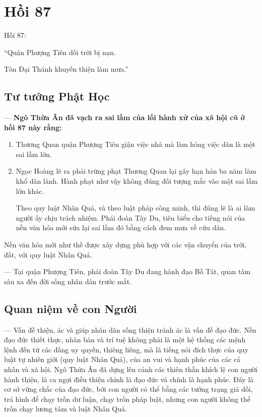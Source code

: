 \chapter{Hồi 87} %
\label{cha:hoi_87}

Hồi 87:

\begin{itshape}
``Quận Phượng Tiên dối trời bị nạn.

Tôn Đại Thánh khuyến thiện làm mưa.''
\end{itshape}

\section{Tư tưởng Phật Học} %
\label{sec:87_phat_hoc}

— {\bf Ngô Thừa Ân đã vạch ra sai lầm của lối hành xử của xã hội cũ ở hồi 87 này rằng:}

\begin{enumerate}[label=\itshape\arabic*\upshape/]
    \item Thương Quan quận Phượng Tiên giận việc nhà mà làm hỏng việc dân là một sai lầm lớn.

    \item Ngọc Hoàng lẽ ra phải trừng phạt Thương Quan lại gây hạn hán ba năm làm khổ dân lành. Hành phạt như vậy không đúng đối tượng mắc vào một sai lầm lớn khác.

    Theo quy luật Nhân Quả, và theo luật pháp công minh, thì đúng lẽ là ai làm người ấy chịu trách nhiệm. Phái đoàn Tây Du, tiêu biểu cho tiếng nói của nền văn hóa mới sửa lại sai lầm đó bằng cách đem mưa về cứu dân.
\end{enumerate}

Nền văn hóa mới như thế được xây dựng phù hợp với các vận chuyển của trời, đất, với quy luật Nhân Quả.

— Tại quận Phượng Tiên, phái đoàn Tây Du đang hành đạo Bồ Tát, quan tâm sâu xa đến đời sống nhân dân trước mắt.

\section{Quan niệm về con Người} %
\label{sec:87_con_nguoi}

— Vấn đề thiện, ác và giúp nhân dân sống thiện tránh ác là vấn đề đạo đức. Nền đạo đức thiết thực, nhân bản và trí tuệ không phải là một hệ thống các mệnh lệnh đến từ các đấng uy quyền, thiêng liêng, mà là tiếng nói đích thực của quy luật tự nhiên giới (quy luật Nhân Quả), của an vui và hạnh phúc của các cá nhân và xã hội. Ngô Thừa Ân đã dựng lên cảnh các thiên thần khích lệ con người hành thiện, là ca ngợi điều thiện chính là đạo đức và chính là hạnh phúc. Đây là cơ sở vững chắc của đạo đức, bởi con người có thể bằng các tướng trạng giả dối, trá hình để chạy trốn dư luận, chạy trốn pháp luật, nhưng con người không thể trốn chạy lương tâm và luật Nhân Quả.

